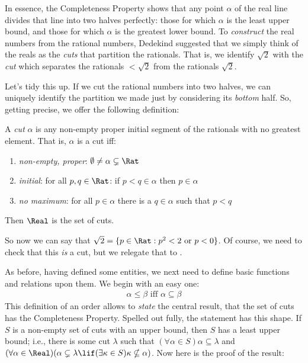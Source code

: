 \documentclass[../../../include/open-logic-section]{subfiles}
\begin{document}

In essence, the Completeness Property shows that any point $\alpha$ of
the real line divides that line into two halves perfectly: those for
which $\alpha$ is the least upper bound, and those for which $\alpha$
is the greatest lower bound. To \emph{construct} the real numbers from
the rational numbers, Dedekind suggested that we simply think of the
reals as the \emph{cuts} that partition the rationals. That is, we
identify $\sqrt{2}$ with the \emph{cut} which separates the rationals
$< \sqrt{2}$ from the rationals $ \sqrt{2}$. 

Let's tidy this up. If we cut the rational numbers into two halves, we
can uniquely identify the partition we made just by considering its
\emph{bottom} half. So, getting precise, we offer the following
definition:

\begin{defn}[Cut] 
A \emph{cut} $\alpha$ is any non-empty proper
initial segment of the rationals with no greatest element. That is,
$\alpha$ is a cut iff:
\begin{enumerate}
	\item \emph{non-empty, proper}: $\emptyset \neq \alpha \subsetneq \Rat$
	\item \emph{initial}: for all $p,q \in \Rat$: if $p < q \in \alpha$ then $p \in \alpha$
	\item \emph{no maximum}: for all $p \in \alpha$ there is a $q \in \alpha$ such that $p < q$ 
\end{enumerate} 
Then $\Real$ is the set of cuts. 
\end{defn}

So now we can say that $\sqrt{2} = \Setabs{p \in \Rat}{p^2 < 2\text{
or }p < 0}$. Of course, we need to check that this \emph{is} a cut,
but we relegate that to .

As before, having defined some entities, we next need to define basic
functions and relations upon them. We begin with an easy one:
\begin{align*}
	\alpha \leq \beta \text{ iff }\alpha \subseteq \beta
\end{align*}
This definition of an order allows to \emph{state} the central result,
that the set of cuts has the Completeness Property. Spelled out fully,
the statement has this shape. If $S$ is a non-empty set of cuts with
an upper bound, then $S$ has a least upper bound; i.e., there is some
cut $\lambda$ such that $(\forall \alpha \in S)\alpha \subseteq
\lambda$ and $(\forall \alpha \in \Real)(\alpha \subsetneq \lambda
\lif (\exists \kappa \in S)\kappa \nsubseteq \alpha)$. Now here is
the proof of the result:
\end{document}
